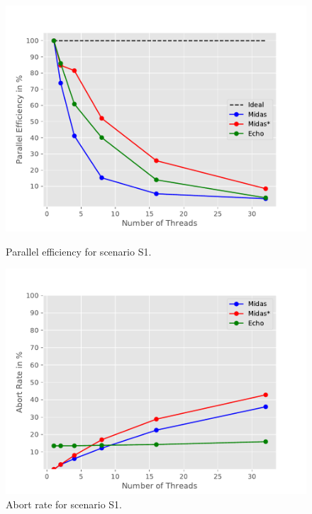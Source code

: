 \begin{figure}[h!]
\begin{minipage}[l]{0.50\textwidth}
    \includegraphics[width=\textwidth]{figures/bench/eff-ss}
    \caption{Parallel efficiency for scenario S1.}
    \label{fig:eff-s1}
\end{minipage}
\begin{minipage}[l]{0.50\textwidth}
    \includegraphics[width=\textwidth]{figures/bench/ar-ss}
    \caption{Abort rate for scenario S1.}
    \label{fig:ar-s1}
\end{minipage}
\end{figure}


